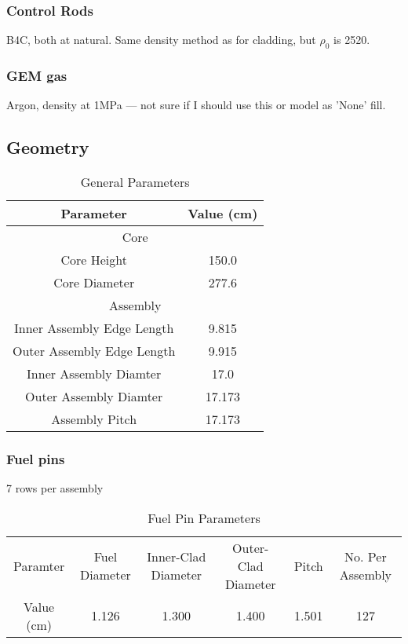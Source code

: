 \documentclass[11pt]{article}
\begin{document}
\subsubsection{Control Rods}

B4C, both at natural. Same density method as for cladding, but $\rho_0$ is 2520. 

\subsubsection{GEM gas}
Argon, density at 1MPa --- not sure if I should use this or model as 'None' fill.

\subsection{Geometry}

\begin{table}[htbp]
    \centering
    \caption{General Parameters}
    \begin{tabular}{cc}
        Parameter & Value (cm)\\
        \toprule
        \bottomrule
        \multicolumn{2}{c}{Core}\\
        \toprule
        \bottomrule
        Core Height  & 150.0 \\
        Core Diameter & 277.6\\
        \toprule
        \bottomrule
        \multicolumn{2}{c}{Assembly}\\
        \toprule
        \bottomrule
        Inner Assembly Edge Length & 9.815\\
        Outer Assembly Edge Length & 9.915\\
        Inner Assembly Diamter & 17.0 \\
        Outer Assembly Diamter & 17.173\\
        Assembly Pitch & 17.173\\
        \toprule
    \end{tabular}
\end{table}

\subsubsection{Fuel pins}
7 rows per assembly
\begin{table}[htbp]
    \centering
    \caption{Fuel Pin Parameters}
    \begin{tabular}{cccccc}
        Paramter & Fuel Diameter & Inner-Clad Diameter & Outer-Clad Diameter & Pitch & No. Per Assembly\\
        Value (cm)& 1.126 & 1.300 & 1.400 & 1.501 & 127\\ 
        \toprule
    \end{tabular}
\end{table}
\end{document}
